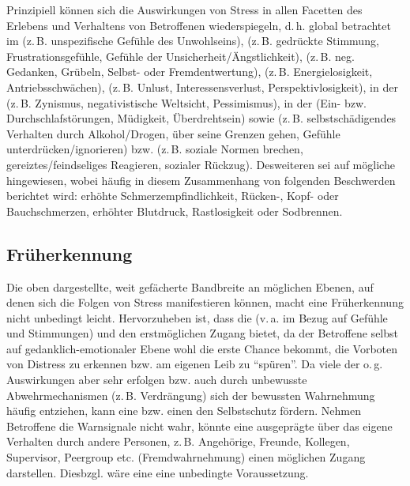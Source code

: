 Prinzipiell können sich die Auswirkungen von Stress in allen
Facetten des Erlebens und Verhaltens von Betroffenen
wiederspiegeln, d.\,h. global betrachtet im  (z.\,B. unspezifische Gefühle des
Unwohlseins),  (z.\,B. gedrückte
Stimmung, Frustrationsgefühle, Gefühle der
Unsicherheit/Ängstlichkeit), 
(z.\,B. neg. Gedanken, Grübeln, Selbst- oder
Fremdentwertung),  (z.\,B. Energielosigkeit,
Antriebsschwächen),  (z.\,B. Unlust,
Interessensverlust, Perspektivlosigkeit), in der
 (z.\,B.
Zynismus, negativistische Weltsicht, Pessimismus), in der
 (Ein- bzw. Durchschlafstörungen,
Müdigkeit, Überdrehtsein) sowie  (z.\,B. selbstschädigendes Verhalten durch
Alkohol/Drogen, über seine Grenzen gehen, Gefühle
unterdrücken/ignorieren) bzw.  (z.\,B. soziale Normen brechen,
gereiztes/feindseliges Reagieren, sozialer Rückzug).
Desweiteren sei auf mögliche 
hingewiesen, wobei häufig in diesem Zusammenhang von
folgenden Beschwerden berichtet wird: erhöhte
Schmerzempfindlichkeit, Rücken-, Kopf- oder Bauchschmerzen,
erhöhter Blutdruck, Rastlosigkeit oder Sodbrennen.

\subsection{Früherkennung}
\label{topic:stressfrueherkennung-psi}

Die oben dargestellte, weit gefächerte Bandbreite an
möglichen Ebenen, auf denen sich die Folgen von Stress
manifestieren können, macht eine Früherkennung nicht
unbedingt leicht. Hervorzuheben ist, dass die  (v.\,a. im Bezug auf Gefühle und
Stimmungen) und  den erstmöglichen Zugang
bietet, da der Betroffene selbst auf gedanklich-emotionaler
Ebene wohl die erste Chance bekommt, die Vorboten von
Distress zu erkennen bzw. am eigenen Leib zu \enquote{spüren}. Da
viele der o.\,g. Auswirkungen aber sehr  erfolgen bzw. auch durch unbewusste
Abwehrmechanismen (z.\,B. Verdrängung) sich der bewussten
Wahrnehmung häufig entziehen, kann eine  bzw.  einen den
Selbstschutz fördern. Nehmen Betroffene die Warnsignale
nicht wahr, könnte eine ausgeprägte  über das eigene Verhalten durch andere Personen,
z.\,B. Angehörige, Freunde, Kollegen, Supervisor, Peergroup
etc. (Fremdwahrnehmung) einen möglichen Zugang darstellen.
Diesbzgl. wäre eine  eine
unbedingte Voraussetzung.


